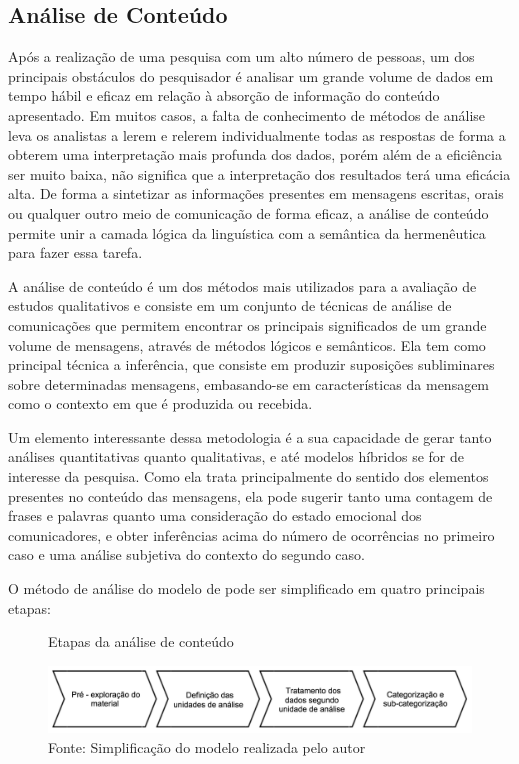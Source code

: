 \subsection{Análise de Conteúdo}
\label{cha:analise_conteudo}

Após a realização de uma pesquisa com um alto número de pessoas, um dos principais obstáculos do pesquisador é analisar um grande volume de dados em tempo hábil e eficaz em relação à absorção de informação do conteúdo apresentado. Em muitos casos, a falta de conhecimento de métodos de análise leva os analistas a lerem e relerem individualmente todas as respostas de forma a obterem uma interpretação mais profunda dos dados, porém além de a eficiência ser muito baixa, não significa que a interpretação dos resultados terá uma eficácia alta. De forma a sintetizar as informações presentes em mensagens escritas, orais ou qualquer outro meio de comunicação de forma eficaz, a análise de conteúdo permite unir a camada lógica da linguística com a semântica da hermenêutica para fazer essa tarefa.

A análise de conteúdo é um dos métodos mais utilizados para a avaliação de estudos qualitativos e consiste em um conjunto de técnicas de análise de comunicações que permitem encontrar os principais significados de um grande volume de mensagens, através de métodos lógicos e semânticos. Ela tem como principal técnica a inferência, que consiste em produzir suposições subliminares sobre determinadas mensagens, embasando-se em características da mensagem como o contexto em que é produzida ou recebida. \cite{bardin}

Um elemento interessante dessa metodologia é a sua capacidade de gerar tanto análises quantitativas quanto qualitativas, e até modelos híbridos se for de interesse da pesquisa. Como ela trata principalmente do sentido dos elementos presentes no conteúdo das mensagens, ela pode sugerir tanto uma contagem de frases e palavras quanto uma consideração do estado emocional dos comunicadores, e obter inferências acima do número de ocorrências no primeiro caso e uma análise subjetiva do contexto do segundo caso.

O método de análise do modelo de  pode ser simplificado em quatro principais etapas:

\begin{figure}[h]
\caption{Etapas da análise de conteúdo}
\centerline{\includegraphics[scale=0.5]{img/fasesanalisedeconteudo}}
\label{fig:fasesanalisedeconteudo}
\caption* {Fonte: Simplificação do modelo  realizada pelo autor}
\end{figure}


